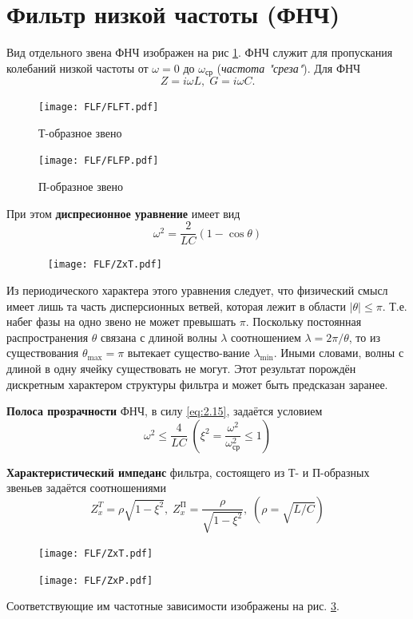 \section{Фильтр низкой частоты (ФНЧ)}
Вид отдельного звена ФНЧ изображен на рис \ref{fig:1.1}. ФНЧ служит для пропускания колебаний низкой частоты от $\omega=0$ до $\omega_{\text{ср}}$ (\textit{частота "среза"}). Для ФНЧ
\begin{equation}
\label{eq:5.1.1}
Z=i\omega L,\;G=i\omega C.
\end{equation}
\begin{figure}[h!]
	\begin{minipage}{0.49\linewidth}
		\centering
		\texttt{[image: FLF/FLFT.pdf]}
		\caption*{Т-образное звено}
	\end{minipage}
\begin{minipage}{0.49\linewidth}
	\centering
	\texttt{[image: FLF/FLFP.pdf]}
	\caption*{П-образное звено}
\end{minipage}
\caption{}
\label{fig:1.1}
\end{figure}
При этом \textbf{диспресионное уравнение} имеет вид 
\begin{equation}
\label{eq:5.1.2}
\omega^2=\frac{2}{LC}(1-\cos\theta)
\end{equation}
\begin{figure}[h!] 
	\centering
	\texttt{[image: FLF/ZxT.pdf]}
	\caption{}
	\label{fig:1.2}
\end{figure}
Из периодического характера этого уравнения следует, что физический смысл имеет лишь та часть дисперсионных ветвей, которая лежит в области $|\theta|\leq\pi$. Т.е. набег фазы на одно звено не может превышать $\pi$. Поскольку постоянная распространения $\theta$ связана с длиной волны $\lambda$ соотношением $\lambda=2\pi/\theta$, то из существования $\theta_{\text{max}}=\pi$ вытекает существо-вание $\lambda_{\text{min}}$. Иными словами, волны с длиной в одну ячейку существовать не могут. Этот результат порождён дискретным характером структуры фильтра и может быть предсказан заранее.

\textbf{Полоса прозрачности} ФНЧ, в силу \eqref{eq:2.15}, задаётся условием
\begin{equation}
\label{eq:5.1.3}
\omega^2\leq\frac{4}{LC}\; (\xi^2=\frac{\omega^2}{\omega^2_{\text{ср}}}\leq1)
\end{equation}

\textbf{Характеристический импеданс} фильтра, состоящего из Т- и П-образных звеньев задаётся соотношениями
\begin{equation}
	Z^T_x=\rho\sqrt{1-\xi^2},\;
	Z^{\text{П}}_x=\frac{\rho}{\sqrt{1-\xi^2}},\;
	(\rho=\sqrt{L/C})
\end{equation}
\begin{figure}[h!]
\begin{minipage}{0.49\linewidth}
	\centering
	\texttt{[image: FLF/ZxT.pdf]}
\end{minipage}
\begin{minipage}{0.49\linewidth}
	\centering
	\texttt{[image: FLF/ZxP.pdf]}
\end{minipage}
\caption{}
\label{fig:1.3}
\end{figure}
Соответствующие им частотные зависимости изображены на рис. \ref{fig:1.3}.

